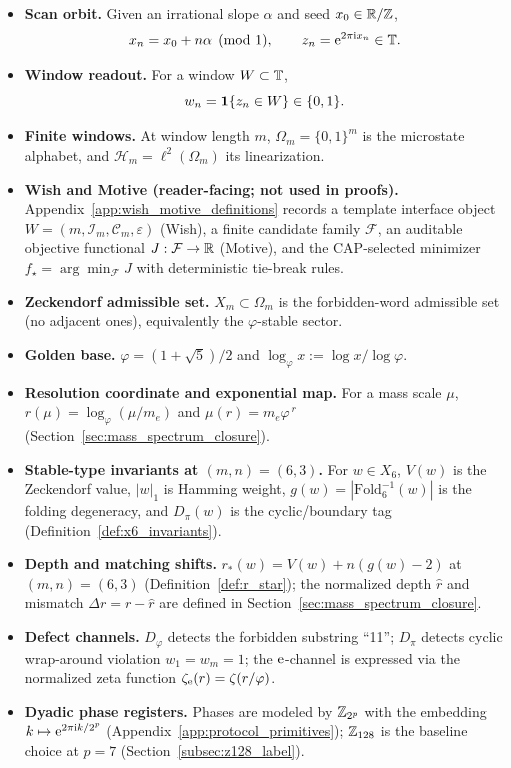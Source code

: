 \begin{itemize}
\item \textbf{Scan orbit.}
Given an irrational slope $\alpha$ and seed $x_0\in\mathbb{R}/\mathbb{Z}$,
\[
x_n=x_0+n\alpha\pmod{1},\qquad z_n=\mathrm{e}^{2\pi\mathrm{i} x_n}\in\mathbb{T}.
\]
\item \textbf{Window readout.}
For a window $W\subset\mathbb{T}$,
\[
w_n=\mathbf{1}\{z_n\in W\}\in\{0,1\}.
\]
\item \textbf{Finite windows.}
At window length $m$, $\Omega_m=\{0,1\}^m$ is the microstate alphabet, and $\mathcal{H}_m=\ell^2(\Omega_m)$ its linearization.
\item \textbf{Wish and Motive (reader-facing; not used in proofs).}
Appendix~\ref{app:wish_motive_definitions} records a template interface object
$W=(m,\mathcal{I}_m,\mathcal{C}_m,\varepsilon)$ (Wish), a finite candidate family $\mathcal{F}$, an auditable objective functional $J:\mathcal{F}\to\mathbb{R}$ (Motive), and the CAP-selected minimizer $f_\star=\arg\min_{\mathcal{F}}J$ with deterministic tie-break rules.
\item \textbf{Zeckendorf admissible set.}
$X_m\subset\Omega_m$ is the forbidden-word admissible set (no adjacent ones), equivalently the $\varphi$-stable sector.
\item \textbf{Golden base.}
$\varphi=(1+\sqrt{5})/2$ and $\log_\varphi x := \log x/\log\varphi$.
\item \textbf{Resolution coordinate and exponential map.}
For a mass scale $\mu$, $r(\mu)=\log_\varphi(\mu/m_e)$ and $\mu(r)=m_e\varphi^{\,r}$ (Section~\ref{sec:mass_spectrum_closure}).
\item \textbf{Stable-type invariants at $(m,n)=(6,3)$.}
For $w\in X_6$, $V(w)$ is the Zeckendorf value, $|w|_1$ is Hamming weight, $g(w)=|\mathrm{Fold}_6^{-1}(w)|$ is the folding degeneracy, and $D_\pi(w)$ is the cyclic/boundary tag (Definition~\ref{def:x6_invariants}).
\item \textbf{Depth and matching shifts.}
$r_\ast(w)=V(w)+n(g(w)-2)$ at $(m,n)=(6,3)$ (Definition~\ref{def:r_star});
the normalized depth $\widehat r$ and mismatch $\Delta r=r-\widehat r$ are defined in Section~\ref{sec:mass_spectrum_closure}.
\item \textbf{Defect channels.}
$D_\varphi$ detects the forbidden substring ``11'';
$D_\pi$ detects cyclic wrap-around violation $w_1=w_m=1$;
the $\mathrm{e}$-channel is expressed via the normalized zeta function $\zeta_{\mathrm{e}}(r)=\zeta(r/\varphi)$.
\item \textbf{Dyadic phase registers.}
Phases are modeled by $\mathbb{Z}_{2^p}$ with the embedding $k\mapsto \mathrm{e}^{2\pi\mathrm{i} k/2^p}$ (Appendix~\ref{app:protocol_primitives}); $\mathbb{Z}_{128}$ is the baseline choice at $p=7$ (Section~\ref{subsec:z128_label}).

\end{itemize}
